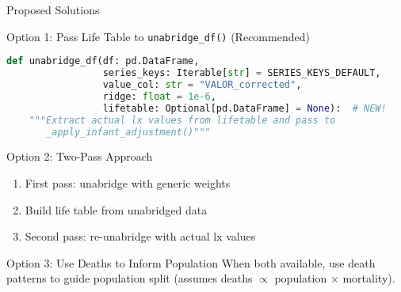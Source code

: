 \documentclass[aspectratio=169]{beamer}
\begin{document}
\begin{frame}[fragile]{Proposed Solutions}
\begin{block}{Option 1: Pass Life Table to \texttt{unabridge\_df()} (Recommended)}
\begin{lstlisting}[language=Python, basicstyle=\ttfamily\scriptsize]
def unabridge_df(df: pd.DataFrame,
                 series_keys: Iterable[str] = SERIES_KEYS_DEFAULT,
                 value_col: str = "VALOR_corrected",
                 ridge: float = 1e-6,
                 lifetable: Optional[pd.DataFrame] = None):  # NEW!
    """Extract actual lx values from lifetable and pass to 
       _apply_infant_adjustment()"""
\end{lstlisting}
\end{block}

\begin{block}{Option 2: Two-Pass Approach}
\begin{enumerate}
    \item First pass: unabridge with generic weights
    \item Build life table from unabridged data
    \item Second pass: re-unabridge with actual lx values
\end{enumerate}
\end{block}

\begin{block}{Option 3: Use Deaths to Inform Population}
When both available, use death patterns to guide population split (assumes deaths $\propto$ population $\times$ mortality).
\end{block}
\end{frame}
\end{document}
